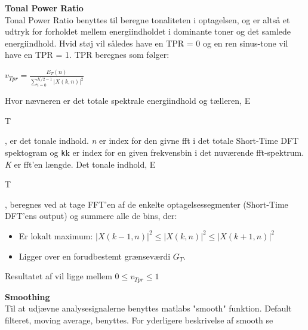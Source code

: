 \textbf{Tonal Power Ratio} \\
Tonal Power Ratio benyttes til beregne tonaliteten i optagelsen, og er altså et udtryk for forholdet mellem energiindholdet i dominante toner og det samlede energiindhold. Hvid støj vil således have en TPR = 0 og en ren sinus-tone vil have en TPR = 1. TPR beregnes som følger: 
\begin{center}
${ v }_{ Tpr }=\frac { { E }_{ T }(n) }{ \sum _{ i=0 }^{ K/2-1 }{ { \left| X(k,n) \right|  }^{ 2 } }  } $
\end{center}

Hvor nævneren er det totale spektrale energiindhold og tælleren, E\begin{tiny}T\end{tiny}, er det tonale indhold. 
\textit{n} er index for den givne fft i det totale Short-Time DFT spektogram og \verb+k+k er index for en given frekvensbin i det nuværende fft-spektrum. \textit{K} er fft'en længde.
Det tonale indhold, E\begin{tiny}T\end{tiny}, beregnes ved at tage FFT'en af de enkelte optagelsessegmenter (Short-Time DFT'ens output) og summere alle de bins, der:
\begin{itemize}
	\item Er lokalt maximum: ${ \left| X(k-1,n) \right|  }^{ 2 }\le { \left| X(k,n) \right|  }^{ 2 }\le { \left| X(k+1,n) \right|  }^{ 2 }$
	\item Ligger over en forudbestemt grænseværdi ${ G }_{ T }$.
\end{itemize} 	

Resultatet af vil ligge mellem $0\le { v }_{ Tpr }\le 1$

\textbf{Smoothing} \\
Til at udjævne analysesignalerne benyttes matlabs "smooth" funktion. Default filteret, moving average, benyttes. For yderligere beskrivelse af smooth se \citep{website:smooth}

